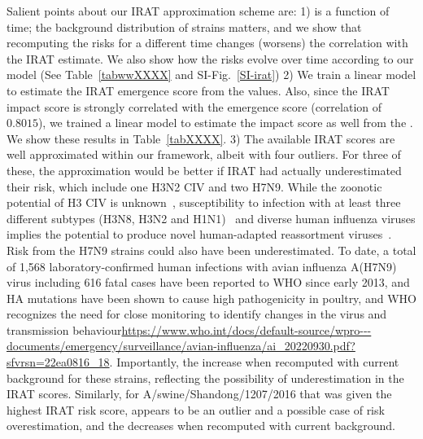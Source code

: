 \documentclass[onecolumn, compsoc,10pt]{IEEEtran}
\begin{document}
Salient points  about our IRAT approximation scheme are: 1) \erisk is a function of time; the background distribution of strains matters, and
we show that recomputing the risks for a different time changes (worsens) the correlation with the IRAT estimate. We also show how the risks evolve over time according to our model (See Table~\ref{tabwwXXXX}  and SI-Fig.~\ref{SI-irat}) 2) We  train a linear model to estimate the IRAT emergence score from the \erisk values. Also, since the IRAT impact score is strongly correlated with the emergence score (correlation of $0.8015$), we  trained a linear model to estimate the impact score as well from the  \erisk. We show these results in Table~\ref{tabXXXX}. 3) 
The available IRAT scores are well approximated within our framework, albeit with  four outliers. For three of these, the approximation would be better if IRAT had actually  underestimated their risk, which include one H3N2 CIV and two H7N9. While the zoonotic potential of H3 CIV is unknown~\cite{martinez2020characterizing}, susceptibility to infection with at least three different \infl subtypes (H3N8, H3N2 and H1N1)~\cite{chang1976influenza,houser1980evidence,chen2018emergence} and diverse human influenza viruses implies the potential to produce novel human-adapted reassortment viruses~\cite{lowen2017constraints}.%
Risk from the H7N9 strains could also have been underestimated.
To date, a total of 1,568 laboratory-confirmed human infections with avian influenza A(H7N9) virus including 616 fatal cases have been reported to WHO since early 2013, and HA mutations have been shown to cause high pathogenicity in poultry, and  WHO recognizes the  need for close monitoring to identify 
changes in the virus and transmission behaviour\url{https://www.who.int/docs/default-source/wpro---documents/emergency/surveillance/avian-influenza/ai_20220930.pdf?sfvrsn=22ea0816_18}.%
 Importantly, %
the \erisk  increase when recomputed with current background for these strains, reflecting the possibility of underestimation in the IRAT scores.  Similarly, for  A/swine/Shandong/1207/2016  that was given the highest IRAT risk score, appears to be an outlier and a possible case of risk overestimation, and the \erisk  decreases  when recomputed with current background.
\end{document}
